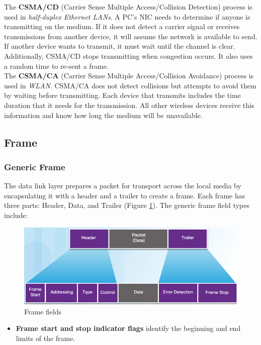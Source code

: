 {The \textbf{CSMA/CD} (Carrier Sense Multiple Access/Collision Detection) process is used in \emph{half-duplex Ethernet LANs}. A PC's NIC needs to determine if anyone is transmitting on the medium. If it does not detect a carrier signal or receives transmissions from another device, it will assume the network is available to send. If another device wants to transmit, it must wait until the channel is clear. Additionally, CSMA/CD stops transmitting when congestion occurs. It also uses a random time to re-sent a frame.\\

The \textbf{CSMA/CA} (Carrier Sense Multiple Access/Collision Avoidance) process is used in \emph{WLAN}. CSMA/CA does not detect collisions but attempts to avoid them by waiting before transmitting. Each device that transmits includes the time duration that it needs for the transmission. All other wireless devices receive this information and know how long the medium will be unavailable. 

\subsection{Frame}

\subsubsection{Generic Frame}

The data link layer prepares a packet for transport across the local media by encapsulating it with a header and a trailer to create a frame. Each frame has three parts: Header, Data, and Trailer (Figure \ref{Frame}). The generic frame field types include:

\begin{figure}[hbtp]
\caption{Frame fields}\label{Frame}
\centering
\includegraphics[scale=0.8]{pictures/Frame.PNG}
\end{figure}


\begin{itemize}
\item \textbf{Frame start and stop indicator flags} identify the beginning and end limits of the frame.


\end{itemize}}
